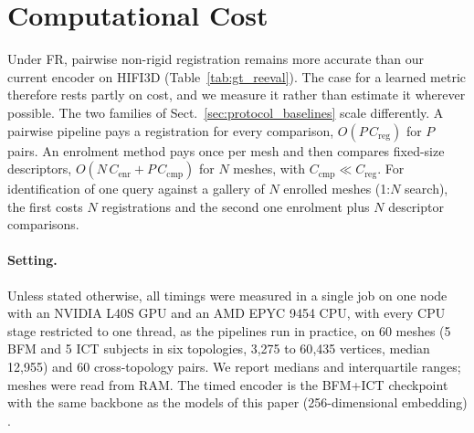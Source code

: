 
\section{Computational Cost}
\label{sec:cost}

Under FR, pairwise non-rigid registration remains more accurate than our
current encoder on HIFI3D (Table~\ref{tab:gt_reeval}). The case for a learned
metric therefore rests partly on cost, and we measure it rather than
estimate it wherever possible. The two families of
Sect.~\ref{sec:protocol_baselines} scale differently. A pairwise pipeline
pays a registration for every comparison, $O(P\,C_{\mathrm{reg}})$ for $P$
pairs. An enrolment method pays once per mesh and then compares fixed-size
descriptors, $O(N\,C_{\mathrm{enr}}+P\,C_{\mathrm{cmp}})$ for $N$ meshes,
with $C_{\mathrm{cmp}}\ll C_{\mathrm{reg}}$. For identification of one query
against a gallery of $N$ enrolled meshes (1:$N$ search), the first costs $N$
registrations and the second one enrolment plus $N$ descriptor comparisons.

\paragraph{Setting.}
Unless stated otherwise, all timings were measured in a single job on one
node with an NVIDIA L40S GPU and an AMD EPYC 9454 CPU, with every CPU stage
restricted to one thread, as the pipelines run in practice, on 60 meshes
(5 BFM and 5 ICT subjects in six topologies, 3{,}275 to 60{,}435 vertices,
median 12{,}955) and 60 cross-topology pairs. We report medians and
interquartile ranges; meshes were read from RAM.
The timed encoder is the BFM+ICT checkpoint with the same backbone as the
models of this paper (256-dimensional embedding)
.

